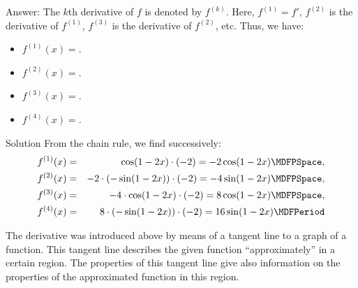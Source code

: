 \begin{MExercises}
\begin{MExercise}
Answer: 
The $k$th derivative of $f$ is denoted by $f^{(k)}$. Here, $f^{(1)} = f'$, $f^{(2)}$ is the derivative of $f^{(1)}$,
$f^{(3)}$ is the derivative of $f^{(2)}$, etc. Thus, we have:
\begin{itemize}
\item
 $f^{(1)}(x) = $.
\item
 $f^{(2)}(x) = $.
\item
 $f^{(3)}(x) = $.
\item
 $f^{(4)}(x) = $.
\end{itemize}
\begin{MHint}{Solution}
    From the chain rule, we find successively:
 \begin{eqnarray*}
  f^{(1)} (x) & = & \cos(1 - 2x) \cdot (-2) = -2 \cos(1 - 2x) \MDFPSpace , \\
  f^{(2)} (x) & = & -2 \cdot \left( - \sin (1 - 2x) \right) \cdot (-2) = -4 \sin (1 - 2x) \MDFPSpace , \\
  f^{(3)} (x) & = & -4 \cdot \cos (1 - 2x) \cdot (-2) = 8 \cos (1 - 2x) \MDFPSpace , \\
  f^{(4)} (x) & = & 8 \cdot \left( - \sin (1 - 2x) \right) \cdot (-2) = 16 \sin (1 - 2x) \MDFPeriod
 \end{eqnarray*}
\end{MHint}
\end{MExercise}

\end{MExercises}




\begin{MIntro}

The derivative was introduced above by means of a tangent line to a graph of a function. This tangent line 
describes the given function ``approximately'' in a certain region. The properties of this tangent line give also
information on the properties of the approximated function in this region.
\end{MIntro}

